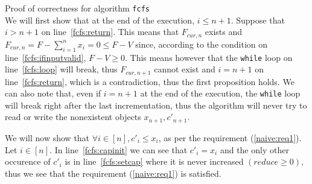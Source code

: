 \begin{sepproof}{Proof of correctness for algorithm \texttt{fcfs}} \ \\
  We will first show that at the end of the execution, $i \leq n+1$. Suppose that $i > n+1$ on line~\ref{fcfs:return}. This
  means that $F_{cur,n}$ exists and $F_{cur,n} = F - \sum\limits_{i=1}^{n}x_i = 0 \leq F - V$ since, according to the
  condition on line~\ref{fcfs:ifinputvalid}, $F - V \geq 0$. This means however that the \texttt{while} loop on
  line~\ref{fcfs:loop} will break, thus $F_{cur,n+1}$ cannot exist and $i = n + 1$ on line~\ref{fcfs:return}, which is a
  contradiction, thus the first proposition holds. We can also note that, even if $i = n + 1$ at the end of the execution,
  the \texttt{while} loop will break right after the last incrementation, thus the algorithm will never try to read or
  write the nonexistent objects $x_{n+1}, c'_{n+1}$.

  We will now show that $\forall i \in [n], c'_i \leq x_i$, as per the requirement (\ref{naive:req1}). Let $i \in [n]$.
  In line~\ref{fcfs:capinit} we can see that $c'_i = x_i$ and the only other occurence of $c'_i$ is in
  line~\ref{fcfs:setcap} where it is never increased $\left(reduce \geq 0\right)$, thus we see that the requirement
  (\ref{naive:req1}) is satisfied.


\end{sepproof}
